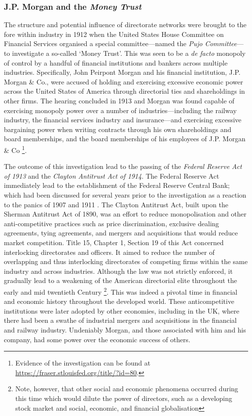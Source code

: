 \subsubsection{J.P. Morgan and the \emph{Money Trust}}

The structure and potential influence of directorate networks were brought to the fore within industry in 1912 when the United States House Committee on Financial Services organised a special committee---named the \emph{Pujo Committee}---to investigate a so-called `Money Trust'. This was seen to be a \emph{de facto} monopoly of control by a handful of financial institutions and bankers across multiple industries. Specifically, John Peirpont Morgan and his financial institution, J.P. Morgan \& Co., were accused of holding and exercising excessive economic power across the United States of America through directorial ties and shareholdings in other firms. The hearing concluded in 1913 and Morgan was found capable of exercising monopoly power over a number of industries---including the railway industry, the financial services industry and insurance---and exercising excessive bargaining power when writing contracts through his own shareholdings and board memberships, and the board memberships of his employees of J.P. Morgan \& Co \footnote{Evidence of the investigation can be found at \href{https://fraser.stlouisfed.org/title/?id=80}{https://fraser.stlouisfed.org/title/?id=80}.}.

The outcome of this investigation lead to the passing of the \emph{Federal Reserve Act of 1913} and the \emph{Clayton Antitrust Act of 1914}. The Federal Reserve Act immediately lead to the establishment of the Federal Reserve Central Bank; which had been discussed for several years prior to the investigation as a reaction to the panics of 1907 and 1911 \citep{Silber2007}. The Clayton Antitrust Act, built upon the Sherman Antitrust Act of 1890, was an effort to reduce monopolisation and other anti-competitive practices such as price discrimination, exclusive dealing agreements, tying agreements, and mergers and acquisitions that would reduce market competition. Title 15, Chapter 1, Section 19 of this Act concerned interlocking directorates and officers. It aimed to reduce the number of overlapping and thus interlocking directorates of competing firms within the same industry and across industries. Although the law was not strictly enforced, it gradually lead to a weakening of the American directorial elite throughout the early and mid twentieth Century \footnote{Note, however, that other social and economic phenomena occurred during this time which would dilute the power of directors, such as a developing stock market and social, economic, and financial globalisation}. This was indeed a pivotal time in financial and economic history throughout the developed world. These anticompetitive institutions were later adopted by other economies, including in the UK, where there had been a swathe of industrial mergers and acquisitions in the financial and railway industry. Undeniably Morgan, and those associated with him and his company, had some power over the economic success of others.

